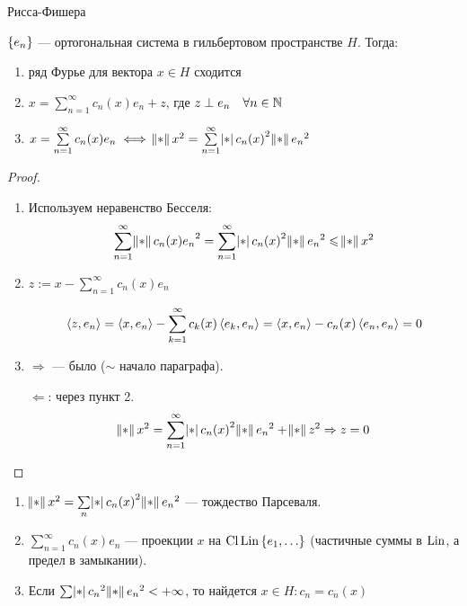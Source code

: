 \begin{theorem}{Рисса-Фишера}

    $\set{e_n}$ --- ортогональная система в гильбертовом пространстве $H$. Тогда:
    \begin{enumerate}
        \item ряд Фурье для вектора $x \in H$ сходится
        \item $x = \sum\limits_{n=1}^\infty c_n(x)e_n + z$, где $z \perp e_n \quad \forall n \in \mathbb{N}$
        \item $x = \sum\limits_{n=1}^\infty c_n(x)e_n \iff \norm{x}^2 = \sum\limits_{n=1}^\infty \abs{c_n(x)}^2 \norm{e_n}^2$
    \end{enumerate}
\end{theorem}
\begin{proof} \quad 

    \begin{enumerate}
        \item Используем неравенство Бесселя: 
        $$\sum\limits_{n=1}^\infty \norm{c_n(x)e_n}^2 = \sum\limits_{n=1}^\infty \abs{c_n(x)}^2 \norm{e_n}^2 \leq \norm{x}^2$$        
        \item $z := x - \sum\limits_{n=1}^\infty c_n(x)e_n$

        $$\left\langle z, e_n \right\rangle = \left\langle x, e_n \right\rangle - \sum\limits_{k=1}^\infty c_k(x) \left\langle e_k, e_n \right\rangle = \left\langle x, e_n \right\rangle - c_n(x) \left\langle e_n, e_n \right\rangle = 0$$
        \item $\Rightarrow$ --- было ($\sim$ начало параграфа).
        
        $\Leftarrow$: через пункт 2. 
        $$\norm{x}^2 = \sum\limits_{n=1}^\infty \abs{c_n(x)}^2 \norm{e_n}^2 + \norm{z}^2 \Rightarrow z = 0$$
    \end{enumerate}
\end{proof}

\begin{observation} \quad 

    \begin{enumerate}
        \item $\norm{x}^2 = \sum\limits_n \abs{c_n(x)}^2 \norm{e_n}^2$ --- тождество Парсеваля.
        \item $\sum\limits_{n=1}^\infty c_n(x) e_n$ --- проекции $x$ на $\operatorname{Cl} \operatorname{Lin} \set{e_1, \ldots}$ (частичные суммы в $\operatorname{Lin}$, а предел в замыкании).
        \item Если $\sum \abs{c_n}^2 \norm{e_n}^2 < +\infty$, то найдется $x \in H: c_n = c_n(x)$
    \end{enumerate}
\end{observation}

\newpage

